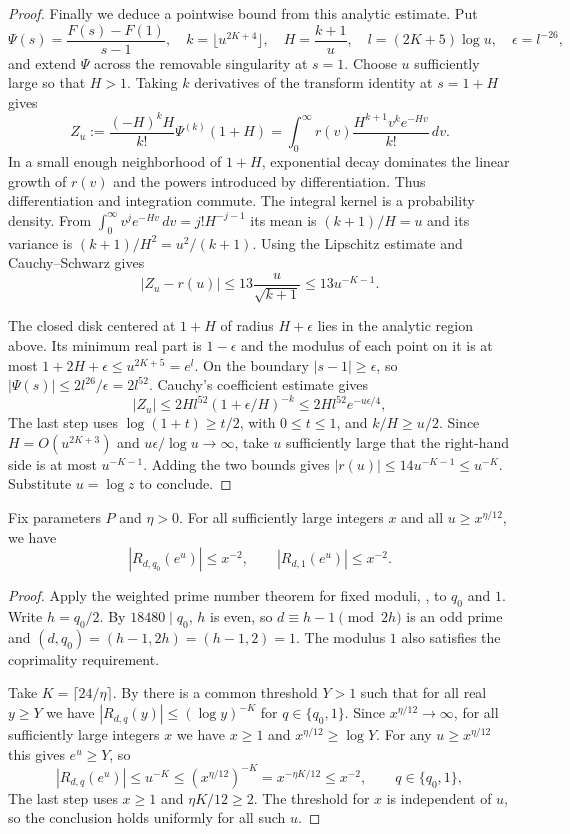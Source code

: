 \begin{proof}
Finally we deduce a pointwise bound from this analytic estimate. Put
\[
 \Psi(s)=\frac{F(s)-F(1)}{s-1},
 \quad k=\lfloor u^{2K+4}\rfloor,
 \quad H=\frac{k+1}{u},\quad l=(2K+5)\log u,\quad \epsilon=l^{-26},
\]
and extend $\Psi$ across the removable singularity at $s=1$. Choose $u$ sufficiently large so that $H>1$. Taking $k$ derivatives of the transform identity at $s=1+H$ gives
\[
 Z_u:=\frac{(-H)^k H}{k!}\Psi^{(k)}(1+H)
  =\int_0^\infty r(v)\frac{H^{k+1}v^k e^{-Hv}}{k!}\,dv .
\]
In a small enough neighborhood of $1+H$, exponential decay dominates the linear growth of $r(v)$ and the powers introduced by differentiation. Thus differentiation and integration commute. The integral kernel is a probability density. From $\int_0^\infty v^j e^{-Hv}\,dv=j!H^{-j-1}$ its mean is $(k+1)/H=u$ and its variance is $(k+1)/H^2=u^2/(k+1)$. Using the Lipschitz estimate and Cauchy--Schwarz gives
\[
 |Z_u-r(u)|\le13\frac{u}{\sqrt{k+1}}\le13u^{-K-1}.
\]

The closed disk centered at $1+H$ of radius $H+\epsilon$ lies in the analytic region above. Its minimum real part is $1-\epsilon$ and the modulus of each point on it is at most $1+2H+\epsilon\le u^{2K+5}=e^l$. On the boundary $|s-1|\ge\epsilon$, so $|\Psi(s)|\le 2l^{26}/\epsilon=2l^{52}$. Cauchy's coefficient estimate gives
\[
 |Z_u|\le2Hl^{52}(1+\epsilon/H)^{-k}
        \le2Hl^{52}e^{-u\epsilon/4},
\]
The last step uses $\log(1+t)\ge t/2$, with $0\le t\le1$, and $k/H\ge u/2$. Since $H=O(u^{2K+3})$ and $u\epsilon/\log u\to\infty$, take $u$ sufficiently large that the right-hand side is at most $u^{-K-1}$. Adding the two bounds gives $|r(u)|\le14u^{-K-1}\le u^{-K}$. Substitute $u=\log z$ to conclude.
\end{proof}

\begin{lemma}
\label{lem:second-scale}
\emitthmsource
Fix parameters $P$ and $\eta>0$. For all sufficiently large integers $x$ and all $u\ge x^{\eta/12}$, we have
\[
 |R_{d,q_0}(e^u)|\le x^{-2},\qquad |R_{d,1}(e^u)|\le x^{-2}.
\]
\end{lemma}
\begin{proof}
Apply the weighted prime number theorem for fixed moduli, , to $q_0$ and $1$. Write $h=q_0/2$. By $18480\mid q_0$, $h$ is even, so $d\equiv h-1\pmod{2h}$ is an odd prime and $(d,q_0)=(h-1,2h)=(h-1,2)=1$. The modulus $1$ also satisfies the coprimality requirement.

Take $K=\lceil24/\eta\rceil$. By  there is a common threshold $Y>1$ such that for all real $y\ge Y$ we have $|R_{d,q}(y)|\le(\log y)^{-K}$ for $q\in\{q_0,1\}$. Since $x^{\eta/12}\to\infty$, for all sufficiently large integers $x$ we have $x\ge1$ and $x^{\eta/12}\ge\log Y$. For any $u\ge x^{\eta/12}$ this gives $e^u\ge Y$, so
\[
 |R_{d,q}(e^u)|\le u^{-K}
 \le (x^{\eta/12})^{-K}=x^{-\eta K/12}\le x^{-2},
 \qquad q\in\{q_0,1\},
\]
The last step uses $x\ge1$ and $\eta K/12\ge2$. The threshold for $x$ is independent of $u$, so the conclusion holds uniformly for all such $u$.
\end{proof}

